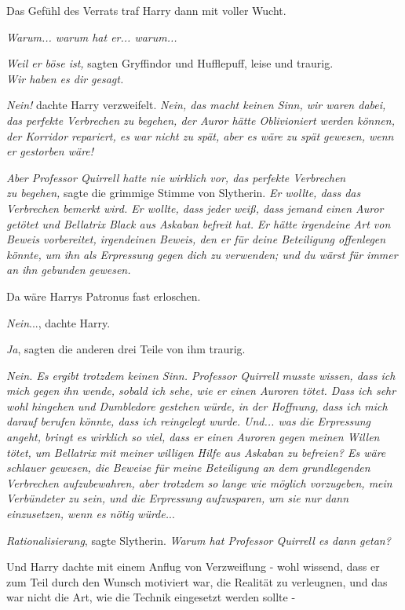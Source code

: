 {Das Gefühl des Verrats traf Harry dann mit voller Wucht.

\emph{Warum... warum hat er... warum...}

\emph{Weil er böse ist,} sagten Gryffindor und Hufflepuff, leise und traurig.\\ \emph{Wir haben es dir gesagt.}

\emph{Nein!} dachte Harry verzweifelt. \emph{Nein, das macht keinen Sinn, wir waren dabei, das perfekte Verbrechen zu begehen, der Auror hätte Oblivioniert werden können, der Korridor repariert, es war nicht zu spät, aber es wäre zu spät gewesen, wenn er gestorben wäre!}

\emph{Aber Professor Quirrell hatte nie wirklich vor, das perfekte Verbrechen}\\ \emph{zu begehen,} sagte die grimmige Stimme von Slytherin. \emph{Er wollte, dass das Verbrechen bemerkt wird. Er wollte, dass jeder weiß, dass jemand einen Auror getötet und Bellatrix Black aus Askaban befreit hat.} \emph{Er hätte irgendeine Art von} \emph{Beweis vorbereitet, irgendeinen Beweis, den er für deine Beteiligung offenlegen könnte, um ihn als Erpressung gegen dich zu verwenden; und du wärst für immer an ihn gebunden gewesen.}

Da wäre Harrys Patronus fast erloschen.

\emph{Nein}..., dachte Harry.

\emph{Ja}, sagten die anderen drei Teile von ihm traurig.

\emph{Nein. Es ergibt trotzdem keinen Sinn. Professor Quirrell musste wissen, dass ich mich gegen ihn wende, sobald ich sehe, wie er einen Auroren tötet. Dass ich sehr wohl hingehen und Dumbledore gestehen würde, in der Hoffnung, dass ich mich darauf berufen könnte, dass ich reingelegt wurde. Und... was die Erpressung angeht, bringt es wirklich so viel, dass er einen Auroren gegen meinen Willen tötet, um Bellatrix mit meiner willigen Hilfe aus Askaban zu befreien? Es wäre schlauer gewesen, die Beweise für meine Beteiligung an dem grundlegenden Verbrechen aufzubewahren, aber trotzdem so lange wie möglich vorzugeben, mein Verbündeter zu sein, und die Erpressung aufzusparen, um sie nur dann einzusetzen, wenn es nötig würde.}..

\emph{Rationalisierung}, sagte Slytherin. \emph{Warum hat Professor Quirrell es dann getan?}

Und Harry dachte mit einem Anflug von Verzweiflung - wohl wissend, dass er zum Teil durch den Wunsch motiviert war, die Realität zu verleugnen, und das war nicht die Art, wie die Technik eingesetzt werden sollte -

}
